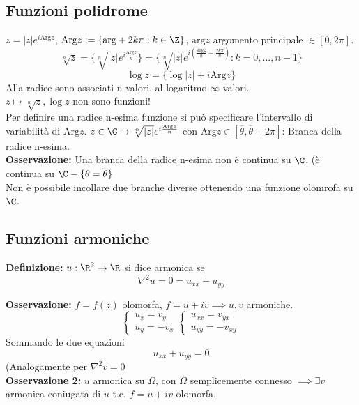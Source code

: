 \subsection{Funzioni polidrome}
$z=|z|e^{i\text{Arg}z}$, $\text{Arg}z:=\{\text{arg}+2k\pi:k\in\Z\} $, $\text{arg}z$ argomento principale $\in[0,2\pi]$.
\[\sqrt[n]{z}=\{\sqrt[n]{|z|}e^{i \frac{\text{Arg}z}{n}} \}=\{\sqrt[n]{|z|}e^{i( \frac{\text{arg}z}{n}+ \frac{2k\pi}{n})}:k=0,\ldots,n-1 \} \]
\[\log z=\{\log |z|+i\text{Arg}z\}\]
Alla radice sono associati n valori, al logaritmo $\infty$ valori.
\\$z \mapsto \sqrt[n]{z},\log z$ non sono funzioni!
\\Per definire una radice n-esima funzione si può specificare l'intervallo di variabilità di $\text{Arg}z$.
$z\in\C\mapsto \sqrt[n]{|z|} e^{i \frac{\text{Arg}z}{n}}$ con $\text{Arg}z\in[\overline \theta,\overline\theta+2\pi]$: Branca della radice n-esima.
\\\textbf{Osservazione:} Una branca della radice n-esima non è continua su $\C$. (è continua su $\C-\{\theta=\overline\theta\}$
\\Non è possibile incollare due branche diverse ottenendo una funzione olomrofa su $\C$.
\subsection{Funzioni armoniche}
\begin{tcolorbox}
	\textbf{Definizione:} $u:\R^2\to \R$ si dice armonica se 
	\[\nabla^2 u=0=u_{x x}+u_{y y}\]
\end{tcolorbox}
\textbf{Osservazione:} $f=f(z)$ olomorfa, $f=u+iv\implies u,v$ armoniche.
\[\begin{cases}
	u_x=v_y
	\\u_y=-v_x
\end{cases}
\begin{cases}
	u_{x x}=v_{y x}\\
	u_{y y}=-v_{xy}
\end{cases}
\]
Sommando le due equazioni
\[u_{x x}+u_{y y}=0\]
(Analogamente per $\nabla ^2 v=0$
\\\textbf{Osservazione 2:} $u$ armonica su $\Omega$, con $\Omega$ semplicemente connesso $\implies\exists v$ armonica coniugata di $u$ t.c. $f=u+iv$ olomorfa.
